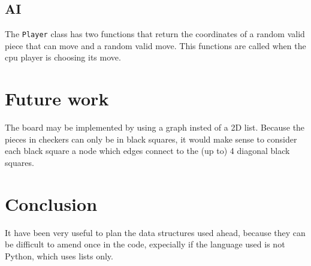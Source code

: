 \documentclass[10pt, a4paper]{article}
\begin{document}
	\subsection{AI}
	The \texttt{Player} class has two functions that return the coordinates of a random valid piece that can move and a random valid move. This functions are called when the cpu player is choosing its move.\\
	
	\section{Future work}
	The board may be implemented by using a graph insted of a 2D list. Because the pieces in checkers can only be in black squares, it would make sense to consider each black square a node which edges connect to the (up to) 4 diagonal black squares.
	
	\section{Conclusion}
	It have been very useful to plan the data structures used ahead, because they can be difficult to amend once in the code, expecially if the language used is not Python, which uses lists only.
		
\end{document}

